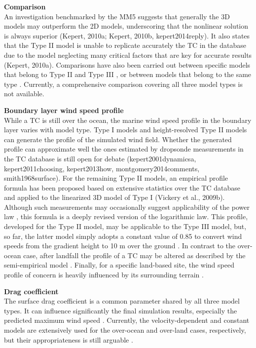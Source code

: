 \noindent\textbf{Comparison } \\An investigation benchmarked by the MM5 \citep{liu1997multiscale} suggests that generally the 3D models may outperform the 2D models, underscoring that the nonlinear solution is always superior (Kepert, 2010a; Kepert, 2010b, kepert2014reply). It also states that the Type II model is unable to replicate accurately the TC in the database due to the model neglecting many critical factors that are key for accurate results (Kepert, 2010a). Comparisons have also been carried out between specific models that belong to Type II and Type III \citep{smith2008critique}, or between models that belong to the same type \citep{snaiki2017linear, wills2000review}. Currently, a comprehensive comparison covering all three model types is not available. 
\newline

\noindent\textbf{Boundary layer wind speed profile} \\While a TC is still over the ocean, the marine wind speed profile in the boundary layer varies with model type. Type I models and height-resolved Type II models can generate the profile of the simulated wind field. Whether the generated profile can approximate well the ones estimated by dropsonde measurements in the TC database is still open for debate (kepert2001dynamicsa, kepert2011choosing, kepert2013how, montgomery2014comments, smith1968surface). For the remaining Type II models, an empirical profile formula has been proposed based on extensive statistics over the TC database and applied to the linearized 3D model of Type I (Vickery et al., 2009b). Although such measurements may occasionally suggest applicability of the power law \citep{song2016characteristics}, this formula is a deeply revised version of the logarithmic law. This profile, developed for the Type II model, may be applicable to the Type III model, but, so far, the latter model simply adopts a constant value of 0.85 to convert wind speeds from the gradient height to 10 m over the ground \citep{chavas2015model}. In contrast to the over-ocean case, after landfall the profile of a TC may be altered as described by the semi-empirical model \citep{snaiki2018semiempirical}. Finally, for a specific land-based site, the wind speed profile of concern is heavily influenced by its surrounding terrain \citep{huang2013prediction}.
\newline

\noindent\textbf{Drag coefficient} \\The surface drag coefficient is a common parameter shared by all three model types. It can influence significantly the final simulation results, especially the predicted maximum wind speed \citep{li2015observations, powell2003reduced}. Currently, the velocity-dependent and constant models are extensively used for the over-ocean and over-land cases, respectively, but their appropriateness is still arguable \citep{smith2014sensitivity}. 
\newline

